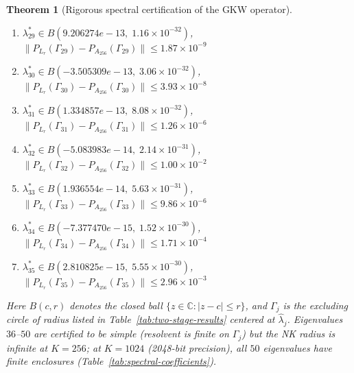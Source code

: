 \documentclass[11pt]{article}
\newtheorem{theorem}{Theorem}
\begin{document}
\begin{theorem}[Rigorous spectral certification of the GKW operator]
\begin{enumerate}
\item $\lambda_{29}^* \in B(9.206274e-13,\; 1.16 \times 10^{-32})$, \quad $\|P_{L_r}(\Gamma_{29}) - P_{A_{256}}(\Gamma_{29})\| \leq 1.87 \times 10^{-9}$
\item $\lambda_{30}^* \in B(-3.505309e-13,\; 3.06 \times 10^{-32})$, \quad $\|P_{L_r}(\Gamma_{30}) - P_{A_{256}}(\Gamma_{30})\| \leq 3.93 \times 10^{-8}$
\item $\lambda_{31}^* \in B(1.334857e-13,\; 8.08 \times 10^{-32})$, \quad $\|P_{L_r}(\Gamma_{31}) - P_{A_{256}}(\Gamma_{31})\| \leq 1.26 \times 10^{-6}$
\item $\lambda_{32}^* \in B(-5.083983e-14,\; 2.14 \times 10^{-31})$, \quad $\|P_{L_r}(\Gamma_{32}) - P_{A_{256}}(\Gamma_{32})\| \leq 1.00 \times 10^{-2}$
\item $\lambda_{33}^* \in B(1.936554e-14,\; 5.63 \times 10^{-31})$, \quad $\|P_{L_r}(\Gamma_{33}) - P_{A_{256}}(\Gamma_{33})\| \leq 9.86 \times 10^{-6}$
\item $\lambda_{34}^* \in B(-7.377470e-15,\; 1.52 \times 10^{-30})$, \quad $\|P_{L_r}(\Gamma_{34}) - P_{A_{256}}(\Gamma_{34})\| \leq 1.71 \times 10^{-4}$
\item $\lambda_{35}^* \in B(2.810825e-15,\; 5.55 \times 10^{-30})$, \quad $\|P_{L_r}(\Gamma_{35}) - P_{A_{256}}(\Gamma_{35})\| \leq 2.96 \times 10^{-3}$

\end{enumerate}
Here $B(c, r)$ denotes the closed ball $\{z \in \mathbb{C} : |z - c| \leq r\}$,
and $\Gamma_j$ is the excluding circle of radius listed in Table~\ref{tab:two-stage-results}
centered at $\hat\lambda_j$.
Eigenvalues $36$--$50$ are certified to be simple (resolvent is finite on $\Gamma_j$)
but the NK radius is infinite at $K = 256$; at $K = 1024$ (2048-bit precision),
all $50$ eigenvalues have finite enclosures (Table~\ref{tab:spectral-coefficients}).


\end{theorem}
\end{document}
